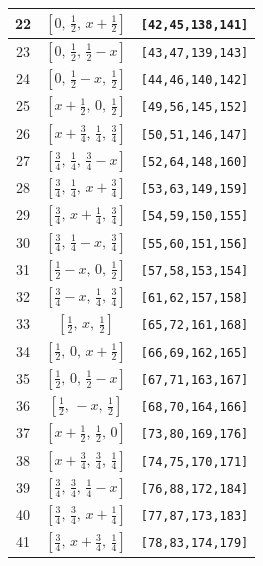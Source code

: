 \documentclass[fleqn,8pt]{jsarticle}
\begin{document}
\begin{longtable}{ccc}
22 & $\left[ 0,\, \frac{1}{2},\, x + \frac{1}{2} \right]$ & {\tt [42,45,138,141]} \\ \hline
23 & $\left[ 0,\, \frac{1}{2},\, \frac{1}{2} - x \right]$ & {\tt [43,47,139,143]} \\ \hline
24 & $\left[ 0,\, \frac{1}{2} - x,\, \frac{1}{2} \right]$ & {\tt [44,46,140,142]} \\ \hline
25 & $\left[ x + \frac{1}{2},\, 0,\, \frac{1}{2} \right]$ & {\tt [49,56,145,152]} \\ \hline
26 & $\left[ x + \frac{3}{4},\, \frac{1}{4},\, \frac{3}{4} \right]$ & {\tt [50,51,146,147]} \\ \hline
27 & $\left[ \frac{3}{4},\, \frac{1}{4},\, \frac{3}{4} - x \right]$ & {\tt [52,64,148,160]} \\ \hline
28 & $\left[ \frac{3}{4},\, \frac{1}{4},\, x + \frac{3}{4} \right]$ & {\tt [53,63,149,159]} \\ \hline
29 & $\left[ \frac{3}{4},\, x + \frac{1}{4},\, \frac{3}{4} \right]$ & {\tt [54,59,150,155]} \\ \hline
30 & $\left[ \frac{3}{4},\, \frac{1}{4} - x,\, \frac{3}{4} \right]$ & {\tt [55,60,151,156]} \\ \hline
31 & $\left[ \frac{1}{2} - x,\, 0,\, \frac{1}{2} \right]$ & {\tt [57,58,153,154]} \\ \hline
32 & $\left[ \frac{3}{4} - x,\, \frac{1}{4},\, \frac{3}{4} \right]$ & {\tt [61,62,157,158]} \\ \hline
33 & $\left[ \frac{1}{2},\, x,\, \frac{1}{2} \right]$ & {\tt [65,72,161,168]} \\ \hline
34 & $\left[ \frac{1}{2},\, 0,\, x + \frac{1}{2} \right]$ & {\tt [66,69,162,165]} \\ \hline
35 & $\left[ \frac{1}{2},\, 0,\, \frac{1}{2} - x \right]$ & {\tt [67,71,163,167]} \\ \hline
36 & $\left[ \frac{1}{2},\, - x,\, \frac{1}{2} \right]$ & {\tt [68,70,164,166]} \\ \hline
37 & $\left[ x + \frac{1}{2},\, \frac{1}{2},\, 0 \right]$ & {\tt [73,80,169,176]} \\ \hline
38 & $\left[ x + \frac{3}{4},\, \frac{3}{4},\, \frac{1}{4} \right]$ & {\tt [74,75,170,171]} \\ \hline
39 & $\left[ \frac{3}{4},\, \frac{3}{4},\, \frac{1}{4} - x \right]$ & {\tt [76,88,172,184]} \\ \hline
40 & $\left[ \frac{3}{4},\, \frac{3}{4},\, x + \frac{1}{4} \right]$ & {\tt [77,87,173,183]} \\ \hline
41 & $\left[ \frac{3}{4},\, x + \frac{3}{4},\, \frac{1}{4} \right]$ & {\tt [78,83,174,179]} \\ \hline

\end{longtable}
\end{document}
